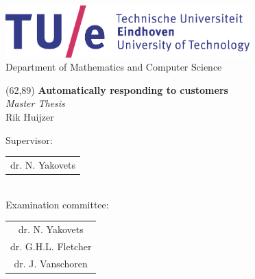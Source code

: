 \documentclass[a4paper,10pt,twoside]{report}
\author{\me}
\newcommand{\doctitle}{Automatically responding to customers}
\newcommand{\docsubtitle}{Master Thesis}
\newcommand{\me}{Rik Huijzer}
\newcommand{\firstCommitteeMember}{dr. N. Yakovets}
\newcommand{\secondCommitteeMember}{dr. G.H.L. Fletcher}
\newcommand{\thirdCommitteeMember}{dr. J. Vanschoren}
\begin{document}
    \begin{center}
        \includegraphics[height=2cm]{figures/tue-logo-high.png}\\
        \large
        Department of Mathematics and Computer Science

        \vspace*{10cm}

        \setlength{\TPHorizModule}{1mm}
        \setlength{\TPVertModule}{\TPHorizModule}
        \newlength{\backupparindent}
        \setlength{\backupparindent}{\parindent}
        \setlength{\parindent}{0mm}
        \begin{textblock}{95}
            (62,89)
            \vspace*{1mm}
            \huge
            \textbf{\doctitle \\}
            \Large
            \vspace*{5mm}
            \textit{\docsubtitle}\\
            \vspace*{10mm}
            \Large
            \me\\
        \end{textblock}

        \large
        Supervisor:\\[1mm]
        \begin{tabular}{c}
            \firstCommitteeMember\\[5mm]
        \end{tabular}\\

        Examination committee:\\[1mm]
        \begin{tabular}{c}
            \firstCommitteeMember\\
            \secondCommitteeMember\\
            \thirdCommitteeMember\\
        \end{tabular}


\end{center}
\end{document}
